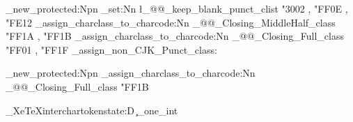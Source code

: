 \cs_new_protected:Npn \JapaneseH
  {
    \ChineseSimplifiedH
    \clist_set:Nn \l_@@_keep_blank_punct_clist
      {
        "3002 , "FF0E , "FE12
      }
    \@@_assign_charclass_to_charcode:Nn \g_@@_Closing_MiddleHalf_class
      {
        "FF1A , "FF1B
      }
    \@@_assign_charclass_to_charcode:Nn \g_@@_Closing_Full_class
      {
        "FF01 , "FF1F
      }
    \@@_assign_non_CJK_Punct_class:
  }

\cs_new_protected:Npn \JapaneseV
  {
    \JapaneseH
    \@@_assign_charclass_to_charcode:Nn \g_@@_Closing_Full_class
      {
        "FF1B
      }
  }


\tex_XeTeXinterchartokenstate:D \c_one_int

\ExplSyntaxOff
\makeatother